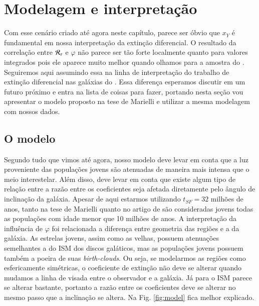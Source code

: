 \section{Modelagem e interpretação}
\label{sec:difextin:modeleinterp}

Com esse cenário criado até agora neste capítulo, parece ser óbvio que $x_Y$ é fundamental em nossa
interpretação da extinção diferencial. O resultado da correlação entre $\mathcal{R}_\tau$ e $\varphi$
não parece ser tão forte localmente quanto para valores integrados pois ele aparece muito melhor
quando olhamos para a amostra do \SDSS. Seguiremos aqui assumindo essa na linha de interpretação do
trabalho de extinção diferencial nas galáxias do \SDSS. Essa diferença esperamos discutir em um
futuro próximo e entra na lista de coisas para fazer, portando nesta seção vou apresentar o modelo
proposto na tese de Marielli e utilizar a mesma modelagem com nossos dados.

\subsection{O modelo}
\label{sec:difextin:modeleinterp:model}

Segundo tudo que vimos até agora, nosso modelo deve levar em conta que a luz proveniente das
populações jovens são atenuadas de maneira mais intensa que o meio interestelar. Além disso, deve
levar em conta que existe algum tipo de relação entre a razão entre os coeficientes seja afetada
diretamente pelo ângulo de inclinação da galáxia. Apesar de aqui estarmos utilizando $t_{SF} = 32$
milhões de anos, tanto na tese de Marielli quanto no artigo de \citet{Charlot.Fall.2000a} são
consideradas jovens todas as populações com idade menor que 10 milhões de anos. A interpretação da
influência de $\varphi$ foi relacionada a diferença entre geometria das regiões \Hii e a da galáxia.
As estrelas jovens, assim como as velhas, possuem atenuações semelhantes a do ISM dos discos
galáticos, mas as populações jovens possuem também a poeira de suas {\em birth-clouds}. Ou seja, se
modelarmos as regiões \Hii como esfericamente simétricas, o coeficiente de extinção não deve se
alterar quando mudamos a linha de visada entre o observador e a galáxia. Já para o ISM parece se
alterar bastante, portanto a razão entre os coeficientes deve se alterar no mesmo passo que a
inclinação se altera. Na Fig.
\ref{fig:model} fica melhor explicado.

